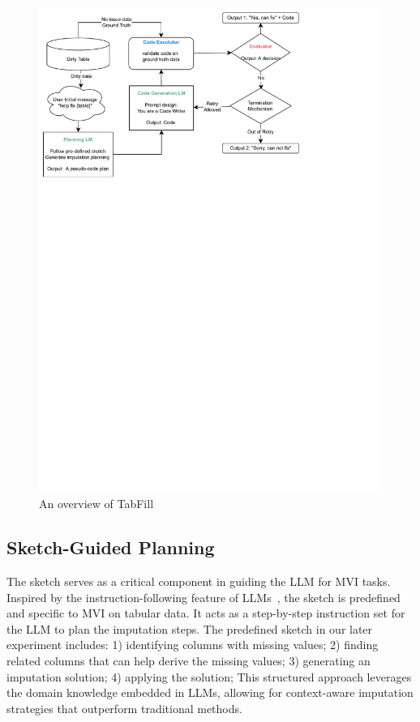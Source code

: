 \documentclass[sigconf]{acmart}
\begin{document}
\begin{figure}
  \centering
  \includegraphics[width=\linewidth]{TabFill.pdf}
  \caption{An overview of TabFill}
  \label{fig:framework}
\end{figure}


\subsection{Sketch-Guided Planning}
The sketch serves as a critical component in guiding the LLM for MVI tasks. Inspired by the instruction-following feature of LLMs~\cite{zhou2023instruction}, the sketch is predefined and specific to MVI on tabular data. It acts as a step-by-step instruction set for the LLM to plan the imputation steps. The predefined sketch in our later experiment includes: 1) identifying columns with missing values; 2) finding related columns that can help derive the missing values; 3) generating an imputation solution; 4) applying the solution; This structured approach leverages the domain knowledge embedded in LLMs, allowing for context-aware imputation strategies that outperform traditional methods.
\end{document}
